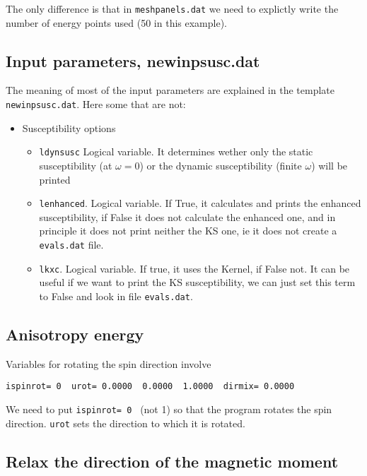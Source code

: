 \documentclass[11pt,fleqn]{book} %
\begin{document}
The only difference is that in \verb|meshpanels.dat| we need to explictly write the
number of energy points used (50 in this example).

\subsection*{Input parameters, newinpsusc.dat}
The meaning of most of the input parameters are explained in the
template \verb|newinpsusc.dat|. Here some that are not:

\begin{itemize}

\item Susceptibility options

\begin{itemize}
\item \verb|ldynsusc| Logical variable. It determines wether only the static susceptibility (at $\omega=0$)
or the dynamic susceptibility (finite $\omega$) will be printed

 \item \verb|lenhanced|. Logical variable. If True, it calculates and prints the enhanced susceptibility,
 if False it does not calculate the enhanced one, and in principle it does not print neither the KS one,
 ie it does not create a \verb|evals.dat| file.

 \item \verb|lkxc|. Logical variable. If true, it uses the Kernel, if False not. It can be useful if
 we want to print the KS susceptibility, we can just set this term to False and look in file
 \verb|evals.dat|.
\end{itemize}

\end{itemize}


\subsection*{Anisotropy energy}
Variables for rotating the spin direction involve
\begin{VBox}
\begin{verbatim}
ispinrot= 0  urot= 0.0000  0.0000  1.0000  dirmix= 0.0000
\end{verbatim}
\end{VBox}
We need to put \verb|ispinrot= 0 | (not 1) so that the program rotates
the spin direction.  \verb|urot| sets the direction to which it is rotated.

\subsection*{Relax the direction of the magnetic moment}
\end{document}
